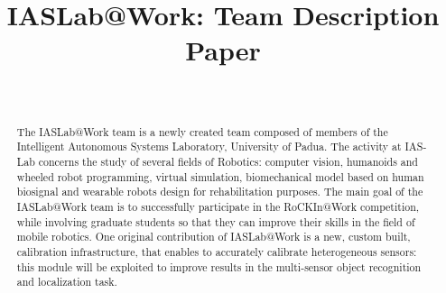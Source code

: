 \documentclass[conference]{IEEEtran}
\begin{document}
%
\title{IASLab@Work: Team Description Paper}

\author{
\\
}

\maketitle


\begin{abstract}
The IASLab@Work team is a newly created team composed of members of the Intelligent Autonomous Systems Laboratory, University of Padua. The activity at IAS-Lab concerns the study of several fields of Robotics: computer vision, humanoids and wheeled robot programming, virtual simulation, biomechanical model based on human biosignal and wearable robots design for rehabilitation purposes. The main goal of the IASLab@Work team is to successfully participate in the RoCKIn@Work competition, while involving graduate students so that they can improve their skills in the field of mobile robotics. One original contribution of IASLab@Work is a new, custom built, calibration infrastructure, that enables to accurately calibrate heterogeneous sensors: this module will be exploited to improve results in the multi-sensor object recognition and localization task.
\end{abstract}
\end{document}
